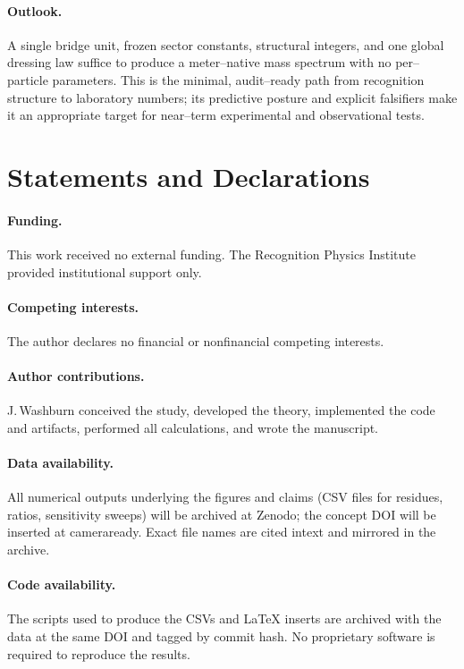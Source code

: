 \documentclass[epjc3]{svjour3}
\begin{document}
\paragraph{Outlook.}
A single bridge unit, frozen sector constants, structural integers, and one global dressing law suffice to produce a meter–native mass spectrum with no per–particle parameters. This is the minimal, audit–ready path from recognition structure to laboratory numbers; its predictive posture and explicit falsifiers make it an appropriate target for near–term experimental and observational tests.

\section*{Statements and Declarations}

\paragraph{Funding.}
This work received no external funding. The Recognition Physics Institute provided institutional support only.

\paragraph{Competing interests.}
The author declares no financial or non\-financial competing interests.

\paragraph{Author contributions.}
J.\,Washburn conceived the study, developed the theory, implemented the code and artifacts, performed all calculations, and wrote the manuscript.

\paragraph{Data availability.}
All numerical outputs underlying the figures and claims (CSV files for residues, ratios, sensitivity sweeps) will be archived at Zenodo; the concept DOI will be inserted at camera\-ready. Exact file names are cited in\-text and mirrored in the archive.

\paragraph{Code availability.}
The scripts used to produce the CSVs and \LaTeX{} inserts are archived with the data at the same DOI and tagged by commit hash. No proprietary software is required to reproduce the results.
\end{document}
